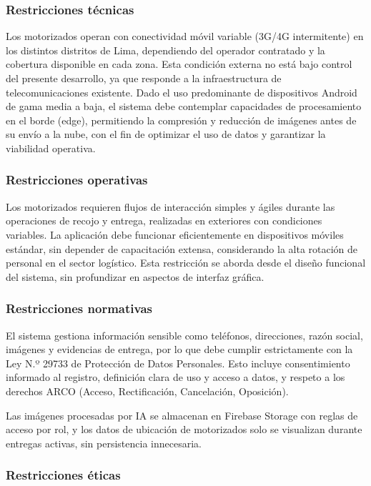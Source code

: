 \subsubsection{Restricciones técnicas}

Los motorizados operan con conectividad móvil variable (3G/4G intermitente) en los distintos distritos de Lima, dependiendo del operador contratado y la cobertura disponible en cada zona. Esta condición externa no está bajo control del presente desarrollo, ya que responde a la infraestructura de telecomunicaciones existente. Dado el uso predominante de dispositivos Android de gama media a baja, el sistema debe contemplar capacidades de procesamiento en el borde (edge), permitiendo la compresión y reducción de imágenes antes de su envío a la nube, con el fin de optimizar el uso de datos y garantizar la viabilidad operativa.

\subsubsection{Restricciones operativas}

Los motorizados requieren flujos de interacción simples y ágiles durante las operaciones de recojo y entrega, realizadas en exteriores con condiciones variables. La aplicación debe funcionar eficientemente en dispositivos móviles estándar, sin depender de capacitación extensa, considerando la alta rotación de personal en el sector logístico. Esta restricción se aborda desde el diseño funcional del sistema, sin profundizar en aspectos de interfaz gráfica.

\subsubsection{Restricciones normativas}

El sistema gestiona información sensible como teléfonos, direcciones, razón social, imágenes y evidencias de entrega, por lo que debe cumplir estrictamente con la Ley N.º 29733 de Protección de Datos Personales. Esto incluye consentimiento informado al registro, definición clara de uso y acceso a datos, y respeto a los derechos ARCO (Acceso, Rectificación, Cancelación, Oposición).

Las imágenes procesadas por IA se almacenan en Firebase Storage con reglas de acceso por rol, y los datos de ubicación de motorizados solo se visualizan durante entregas activas, sin persistencia innecesaria.

\subsubsection{Restricciones éticas}

